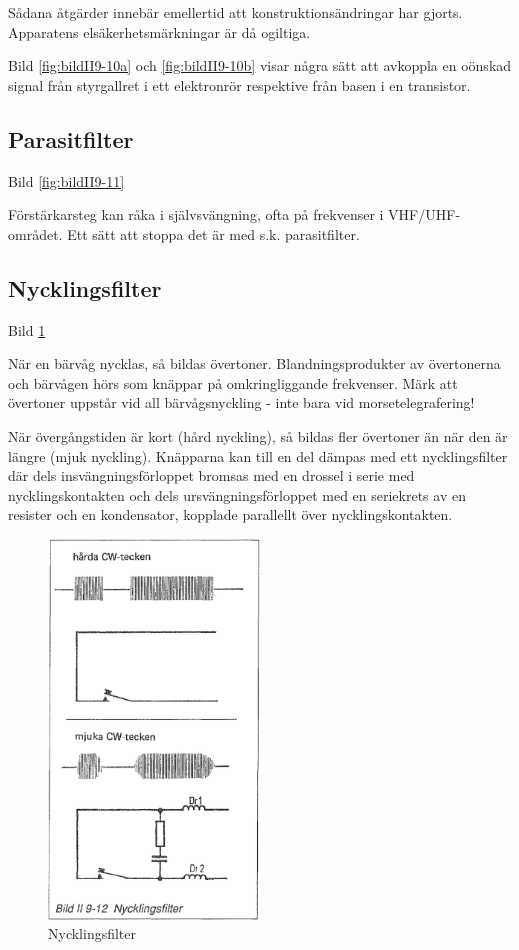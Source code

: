 Sådana åtgärder innebär emellertid att konstruktionsändringar har
gjorts. Apparatens elsäkerhetsmärkningar är då ogiltiga.

Bild \ref{fig:bildII9-10a} och \ref{fig:bildII9-10b} visar några sätt att avkoppla en oönskad signal från
styrgallret i ett elektronrör respektive från basen i en transistor.

\subsection{Parasitfilter}

Bild \ref{fig:bildII9-11}

Förstärkarsteg kan råka i självsvängning, ofta på frekvenser i
VHF/UHF-området. Ett sätt att stoppa det är med s.k. parasitfilter.

\subsection{Nycklingsfilter}

Bild \ref{fig:bildII9-12}

När en bärvåg nycklas, så bildas övertoner.  Blandningsprodukter av
övertonerna och bärvågen hörs som knäppar på omkringliggande
frekvenser. Märk att övertoner uppstår vid all bärvågsnyckling - inte
bara vid morsetelegrafering!

När övergångstiden är kort (hård nyckling), så bildas fler övertoner
än när den är längre (mjuk nyckling). Knäpparna kan till en del dämpas
med ett nycklingsfilter där dels insvängningsförloppet bromsas med en
drossel i serie med nycklingskontakten och dels ursvängningsförloppet
med en seriekrets av en resister och en kondensator, kopplade
parallellt över nycklingskontakten.

\begin{figure}
  \includegraphics[width=0.5\textwidth]{images/bild_2_9-12}
  \caption{Nycklingsfilter}
  \label{fig:bildII9-12}
\end{figure}

